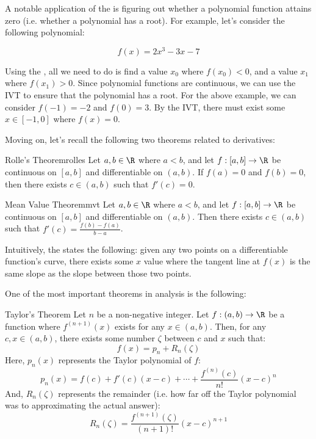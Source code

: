 A notable application of the  is figuring out whether a polynomial function attains zero (i.e. whether a polynomial has a root). For example, let's consider the following polynomial:

\[ f(x) = 2x^3 - 3x - 7\]

Using the , all we need to do is find a value $x_0$ where $f(x_0) < 0$, and a value $x_1$ where $f(x_1) > 0$. Since polynomial functions are continuous, we can use the IVT to ensure that the polynomial has a root. For the above example, we can consider $f(-1) = -2$ and $f(0) = 3$. By the IVT, there must exist some $x \in [-1, 0]$ where $f(x) = 0$.

Moving on, let's recall the following two theorems related to derivatives:

\begin{thmbox}{Rolle's Theorem}{rolles}
    Let $a,b \in \R$ where $a < b$, and let $f : [a,b] \to \R$ be continuous on $[a,b]$ and differentiable on $(a,b)$. If $f(a) = 0$ and $f(b) = 0$, then there exists $c \in (a,b)$ such that $f\prime(c) = 0$.
\end{thmbox}

\begin{thmbox}{Mean Value Theorem}{mvt}
    Let $a,b \in \R$ where $a < b$, and let $f : [a,b] \to \R$ be continuous on $[a,b]$ and differentiable on $(a,b)$. Then there exists $c \in (a,b)$ such that $f\prime(c) = \frac{f(b) - f(a)}{b-a}$.
\end{thmbox}

Intuitively, the  states the following: given any two points on a differentiable function's curve, there exists some $x$ value where the tangent line at $f(x)$ is the same slope as the slope between those two points.

One of the most important theorems in analysis is the following:

\begin{thmbox}{Taylor's Theorem}{}
    Let $n$ be a non-negative integer. Let $f : (a,b) \to \R$ be a function where $f^{(n+1)} (x)$ exists for any $x \in (a,b)$. Then, for any $c,x \in (a,b)$, there exists some number $\zeta$ between $c$ and $x$ such that:
    \[ f(x) = p_n + R_n(\zeta) \]
    Here, $p_n(x)$ represents the Taylor polynomial of $f$:
    \[ p_n(x) = f(c) + f\prime(c)(x-c) + \cdots + \frac{f^{(n)}(c)}{n!} (x-c)^n \]
    And, $R_n(\zeta)$ represents the remainder (i.e. how far off the Taylor polynomial was to approximating the actual answer):
    \[ R_n(\zeta) = \frac{f^{(n+1)}(\zeta)}{(n+1)!} (x-c)^{n+1} \]
\end{thmbox}

